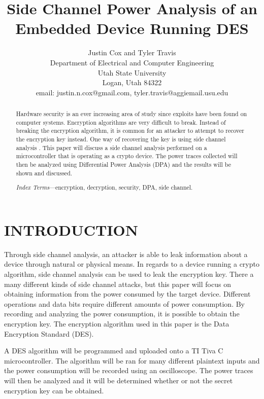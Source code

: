 \documentclass[letterpaper, 10 pt, conference]{ieeeconf}  %
\title{\LARGE \bf
Side Channel Power Analysis of an Embedded Device Running DES  
}
\author{Justin Cox and Tyler Travis
\\ \small{Department of Electrical and Computer Engineering}
\\ \small{Utah State University}
\\ \small{Logan, Utah 84322}
\\ \small{email: justin.n.cox@gmail.com, tyler.travis@aggiemail.usu.edu}
}
\begin{document}
\maketitle
\thispagestyle{empty}
\pagestyle{empty}


\begin{abstract}

Hardware security is an ever increasing area of study since exploits have been found on computer systems.  Encryption algorithms are very difficult to break.  Instead of breaking the encryption algorithm, it is common for an attacker to attempt to recover the encryption key instead.  One way of recovering the key is using side channel analysis    .  This paper will discuss a side channel analysis performed on a microcontroller that is operating as a crypto device.  The power traces collected will then be analyzed using Differential Power Analysis (DPA) and the results will be shown and discussed.

\emph{Index Terms}---encryption, decryption, security, DPA, side channel.

\end{abstract}

\section{INTRODUCTION}

Through side channel analysis, an attacker is able to leak information   about a device through natural or physical means.  In regards to a device running a crypto algorithm, side channel analysis can be used to leak the encryption key.  There a many different kinds of side channel attacks, but this paper will focus on obtaining information from the power consumed by the target device.  Different operations and data bits require different amounts of power consumption.  By recording and analyzing the power consumption, it is possible to obtain the encryption key.  The encryption algorithm used in this paper is the Data Encryption Standard (DES).

A DES algorithm will be programmed and uploaded onto a TI Tiva C microcontroller.  The algorithm will be ran for many different plaintext inputs and the power consumption will be recorded using an oscilloscope.  The power traces will then be analyzed and it will be determined whether or not the secret encryption key can be obtained.  
\end{document}
